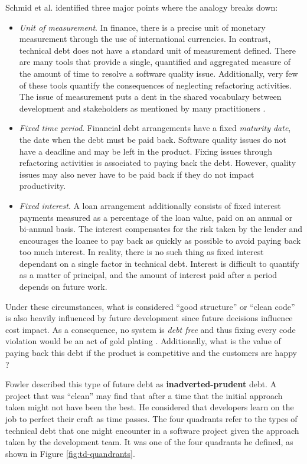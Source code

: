 \documentclass{mprop}
\begin{document}
Schmid et al. \cite{Schmid2013} identified three major points where the analogy
breaks down:
\begin{itemize}
	\item \textit{Unit of measurement}. In finance, there is a precise unit of
	      monetary measurement through the use of international currencies. In
	      contrast, technical debt does not have a standard unit of measurement
	      defined. There are many tools \cite{Fontana2016} that provide a
	      single, quantified and aggregated measure of the amount of time to
	      resolve a software quality issue. Additionally, very few of these
	      tools quantify the consequences of neglecting refactoring activities.
	      The issue of measurement puts a dent in the shared vocabulary between
	      development and stakeholders as mentioned by many practitioners
	      \cite{Lim2012} \cite{Codabux2013}.
	\item \textit{Fixed time period}. Financial debt arrangements have a fixed
	      \textit{maturity date}, the date when the debt must be paid back.
	      Software quality issues do not have a deadline and may be left in the
	      product. Fixing issues through refactoring activities is associated to
	      paying back the debt. However, quality issues may also never have to
	      be paid back if they do not impact productivity.
	\item \textit{Fixed interest}. A loan arrangement additionally consists of
	      fixed interest payments measured as a percentage of the loan value,
	      paid on an annual or bi-annual basis. The interest compensates for the
	      risk taken by the lender and encourages the loanee to pay back as
	      quickly as possible to avoid paying back too much interest. In
	      reality, there is no such thing as fixed interest dependant on a
	      single factor in technical debt. Interest is difficult to quantify as
	      a matter of principal, and the amount of interest paid after a period
	      depends on future work.
\end{itemize}
Under these circumstances, what is considered ``good structure'' or ``clean code''
is also heavily influenced by future development since future decisions
influence cost impact. As a consequence, no system is \textit{debt free} and
thus fixing every code violation would be an act of gold plating
\cite{Kruchten2012}. Additionally, what is the value of paying back this debt if
the product is competitive and the customers are happy \cite{Lim2012}?

Fowler \cite{TDMartin} described this type of future debt as
\textbf{inadverted-prudent} debt. A project that was ``clean'' may find that after
a time that the initial approach taken might not have been the best. He
considered that developers learn on the job to perfect their craft as time
passes. The four quadrants refer to the types of technical debt that one might
encounter in a software project given the approach taken by the development
team. It was one of the four quadrants he defined, as shown in Figure
\ref{fig:td-quandrants}.
\end{document}

